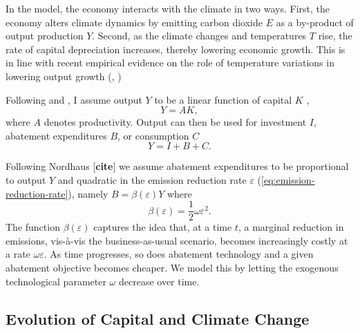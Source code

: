 \documentclass[../../main.tex]{subfiles}
\begin{document}
In the model, the economy interacts with the climate in two ways. First, the economy alters climate dynamics by emitting carbon dioxide $E$ as a by-product of output production $Y$. Second, as the climate changes and temperatures $T$ rise, the rate of capital depreciation increases, thereby lowering economic growth. This is in line with recent empirical evidence on the role of temperature variations in lowering output growth (\citeauthor{dellemperature_2012}, \citeyear{dellemperature_2012, dellemperature_2009}) 

Following  and , I assume output $Y$ to be a linear function of capital $K$ , \begin{equation}
Y =  A K,
\end{equation} where $A$ denotes productivity. Output can then be used for investment $I$, abatement expenditures $B$, or consumption $C$ \begin{equation} \label{eq:nominal-budget}
    Y = I + B + C.
\end{equation}

Following Nordhaus [\textbf{cite}] we assume abatement expenditures to be proportional to output $Y$ and quadratic in the emission reduction rate $\varepsilon$ (\ref{eq:emission-reduction-rate}), namely $B = \beta(\varepsilon) Y $ where \begin{equation} \label{eq:abatement-costs}
    \beta(\varepsilon) = \frac{1}{2} \omega \varepsilon^2.
\end{equation} The function $\beta(\varepsilon)$ captures the idea that, at a time $t$, a marginal reduction in emissions, vis-à-vis the business-as-usual scenario, becomes increasingly costly at a rate $\omega \varepsilon$. As time progresses, so does abatement technology and a given abatement objective becomes cheaper. We model this by letting the exogenous technological parameter $\omega$ decrease over time.

\subsection{Evolution of Capital and Climate Change}
\end{document}

